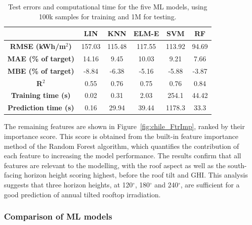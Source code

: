 \begin{table}[tb]
\centering
\footnotesize
\caption{Test errors and computational time for the five ML models, using 100k samples for training and 1M for testing.}
\label{tab:chile_results}
\begin{tabular}{cccccc}
\hline
\textbf{}                    & \textbf{LIN} & \textbf{KNN} & \textbf{ELM-E} & \textbf{SVM} & \textbf{RF} \\ \hline
\textbf{RMSE (kWh/m$^2$)}       & 157.03       & 115.48       & 117.55         & 113.92       & 94.69       \\
\textbf{MAE (\% of target)}  & 14.16        & 9.45         & 10.03          & 9.21         & 7.66        \\
\textbf{MBE (\% of target)}  & -8.84        & -6.38        & -5.16          & -5.88        & -3.87       \\
\textbf{R$^2$}                  & 0.55         & 0.76         & 0.75           & 0.76         & 0.84        \\
\textbf{Training time (s)}   & 0.02         & 0.31         & 2.03           & 254.1        & 44.42       \\
\textbf{Prediction time (s)} & 0.16         & 29.94        & 39.44          & 1178.3       & 33.3        \\ \hline
\end{tabular}
\end{table}

The remaining features are shown in Figure~\ref{fig:chile_FtrImp}, ranked by their importance score. This score is obtained from the built-in feature importance method of the Random Forest algorithm, which quantifies the contribution of each feature to increasing the model performance. The results confirm that all features are relevant to the modelling, with the roof aspect as well as the south-facing horizon height scoring highest, before the roof tilt and GHI. This analysis suggests that three horizon heights, at 120$^\circ$, 180$^\circ$ and 240$^\circ$, are sufficient for a good prediction of annual tilted rooftop irradiation.

\subsubsection{Comparison of ML models}

